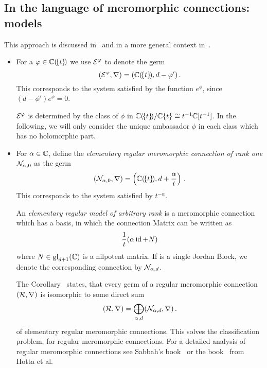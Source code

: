 \subsection{In the language of meromorphic connections: models}
This approach is discussed in~\cite{sabbah_cimpa90} and in a more general
context in~\cite[Sec.II.5]{sabbah2007isomonodromic}.
\begin{defn}\label{defn:elemnMerConnBausteine}
  \begin{itemize}
    \item For a $\varphi\in\mathbb{C}(\!\{t\}\!)$ we use $\mathcal{E}^{\varphi}$ to denote the germ
      \[
        (\mathcal{E}^{\varphi},\nabla)=(\mathbb{C}(\!\{t\}\!),d-\varphi')\,.
      \]
      This corresponds to the system satisfied by the function $e^\phi$, since
      $(d-\phi')e^\phi=0$.
      \begin{s-cor}
        $\mathcal{E}^\varphi$ is determined by the class of $\phi$ in
        $\mathbb{C}(\!\{t\}\!)/\mathbb{C}\{t\}\cong t^{-1}\mathbb{C}[t^{-1}]$. In the following, we
        will only consider the unique ambassador $\phi$ in each class which has
        no holomorphic part.
      \end{s-cor}
    \item For $\alpha\in\mathbb{C}$, define the \emph{elementary regular meromorphic
      connection of rank one} $\mathcal{N}_{\alpha,0}$ as the germ
      \[
        (\mathcal{N}_{\alpha,0},\nabla)=\left(\mathbb{C}(\!\{t\}\!),d+\frac{\alpha}{t}\right)
        \,.
      \]
      This corresponds to the system satisfied by $t^{-\alpha}$.

      An \emph{elementary regular model of arbitrary rank} is a meromorphic
      connection which has a basis, in which the connection Matrix can be
      written as
      \[
        \frac{1}{t} (\alpha\operatorname{id}+N)
      \]
      where $N\in\operatorname{gl}_{d+1}(\mathbb{C})$ is a nilpotent matrix.
      If  is a single Jordan Block, we denote the
      corresponding connection by $\mathcal{N}_{\alpha,d}$.
      \begin{s-rem}
        The Corollary~\cite[Cor.II.2.9]{sabbah2007isomonodromic} states, that
        every germ of a regular meromorphic connection $(\mathcal{R},\nabla)$ is
        isomorphic to some direct sum
        \[
          (\mathcal{R},\nabla)=\bigoplus_{\alpha,d}(\mathcal{N}_{\alpha,d},\nabla)\,.
        \]
        of elementary regular meromorphic connections.
        This solves the classification problem, for regular meromorphic
        connections.
        For a detailed analysis of regular meromorphic connections see Sabbah's
        book~\cite[Sec.II.2]{sabbah2007isomonodromic} or the
        book~\cite[Sec.5.2]{hotta2008} from Hotta et al.
      \end{s-rem}
  \end{itemize}
\end{defn}
